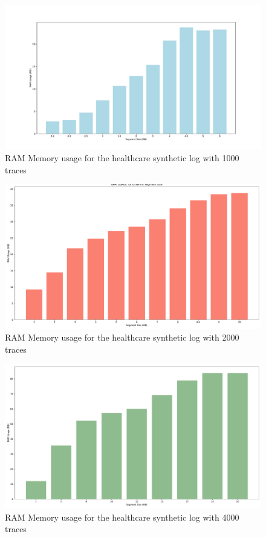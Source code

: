 \begin{figure}[t]
\centering
\includegraphics[width=1\linewidth]{content/figures/barplot_segsize.pdf}
\caption{RAM Memory usage for the healthcare synthetic log with 1000 traces}
\label{fig:barplot_segsize}
\end{figure}

\begin{figure}[t]
\centering
\includegraphics[width=1\linewidth]{content/figures/barplot_segsize_syth_2k.pdf}
\caption{RAM Memory usage for the healthcare synthetic log with 2000 traces}
\label{fig:barplot_segsize_synth_2k}
\end{figure}

\begin{figure}[t]
\centering
\includegraphics[width=1\linewidth]{content/figures/barplot_segsize_syth_4k.pdf}
\caption{RAM Memory usage for the healthcare synthetic log with 4000 traces}
\label{fig:barplot_segsize_synth_4k}
\end{figure}

